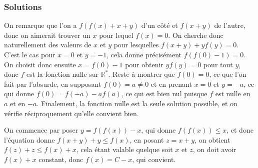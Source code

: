 








\subsubsection{Solutions}

\begin{sol}
On remarque que l'on a $f(f(x)+x+y)$ d'un côté et $f(x+y)$ de l'autre, donc on aimerait trouver un $x$ pour lequel $f(x)=0$. On cherche donc naturellement des valeurs de $x$ et $y$ pour lesquelles $f(x+y)+yf(y)=0$. C'est le cas pour $x=0$ et $y=-1$, cela donne précisément $f(f(0)-1)=0$. On choisit donc ensuite $x=f(0)-1$ pour obtenir $yf(y)=0$ pour tout $y$, donc $f$ est la fonction nulle sur $\mathbb R^*$. Reste à montrer que $f(0)=0$, ce que l'on fait par l'absurde, en supposant $f(0)=a\neq 0$ et en prenant $x=0$ et $y=-a$, ce qui donne $f(0)=f(-a)-af(a)$, ce qui est bien nul puisque $f$ est nulle en $a$ et en $-a$. Finalement, la fonction nulle est la seule solution possible, et on vérifie réciproquement qu'elle convient bien.
\end{sol}


\begin{sol}
On commence par poser $y=f(f(x))-x$, qui donne $f(f(x))\le x$, et donc l'équation donne $f(x+y)+y\le f(x)$, en posant $z=x+y$, on obtient $f(z)+z\le f(x)+x$, cela étant valable quelque soit $x$ et $z$, on doit avoir $f(x)+x$ constant, donc $f(x)=C-x$, qui convient.
\end{sol}

